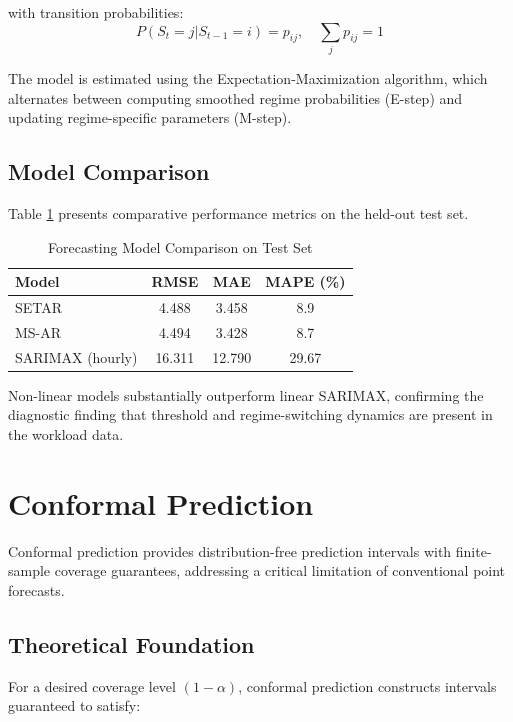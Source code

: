 \documentclass[12pt]{report}
\begin{document}
with transition probabilities:
\begin{equation}
P(S_t = j | S_{t-1} = i) = p_{ij}, \quad \sum_j p_{ij} = 1
\end{equation}

The model is estimated using the Expectation-Maximization algorithm, which alternates between computing smoothed regime probabilities (E-step) and updating regime-specific parameters (M-step).

\subsection{Model Comparison}

Table \ref{tab:model_comparison} presents comparative performance metrics on the held-out test set.

\begin{table}[H]
\centering
\caption{Forecasting Model Comparison on Test Set}
\label{tab:model_comparison}
\begin{tabular}{lccc}
\toprule
\textbf{Model} & \textbf{RMSE} & \textbf{MAE} & \textbf{MAPE (\%)} \\
\midrule
SETAR & 4.488 & 3.458 & 8.9 \\
MS-AR & 4.494 & 3.428 & 8.7 \\
SARIMAX (hourly) & 16.311 & 12.790 & 29.67 \\
\bottomrule
\end{tabular}
\end{table}

Non-linear models substantially outperform linear SARIMAX, confirming the diagnostic finding that threshold and regime-switching dynamics are present in the workload data.

\section{Conformal Prediction}

Conformal prediction provides distribution-free prediction intervals with finite-sample coverage guarantees, addressing a critical limitation of conventional point forecasts.

\subsection{Theoretical Foundation}

For a desired coverage level $(1-\alpha)$, conformal prediction constructs intervals guaranteed to satisfy:
\end{document}
